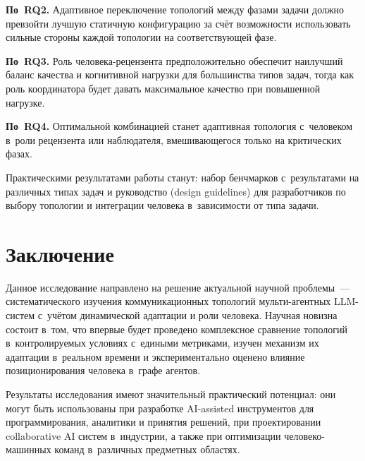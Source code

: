 \documentclass[12pt, a4paper]{article}
\begin{document}
\textbf{По~RQ2.} Адаптивное переключение топологий между фазами задачи должно превзойти лучшую статичную конфигурацию за счёт возможности использовать сильные стороны каждой топологии на соответствующей фазе.

\textbf{По~RQ3.} Роль человека-рецензента предположительно обеспечит наилучший баланс качества и когнитивной нагрузки для большинства типов задач, тогда как роль координатора будет давать максимальное качество при повышенной нагрузке.

\textbf{По~RQ4.} Оптимальной комбинацией станет адаптивная топология с~человеком в~роли рецензента или наблюдателя, вмешивающегося только на критических фазах.

Практическими результатами работы станут: набор бенчмарков с~результатами на различных типах задач и руководство (design guidelines) для разработчиков по выбору топологии и интеграции человека в~зависимости от типа задачи.


\section{Заключение}

Данное исследование направлено на решение актуальной научной проблемы~--- систематического изучения коммуникационных топологий мульти-агентных LLM-систем с~учётом динамической адаптации и роли человека. Научная новизна состоит в~том, что впервые будет проведено комплексное сравнение топологий в~контролируемых условиях с~едиными метриками, изучен механизм их адаптации в~реальном времени и экспериментально оценено влияние позиционирования человека в~графе агентов.

Результаты исследования имеют значительный практический потенциал: они могут быть использованы при разработке AI-assisted инструментов для программирования, аналитики и принятия решений, при проектировании collaborative AI систем в~индустрии, а также при оптимизации человеко-машинных команд в~различных предметных областях.
\end{document}

